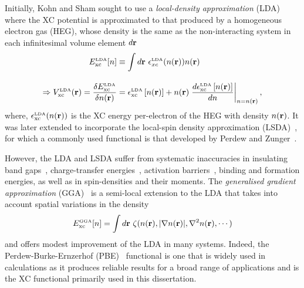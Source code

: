 Initially, Kohn and Sham sought to use a 
\emph{local-density approximation} (LDA)~\cite{PhysRev.140.A1133,PhysRevLett.45.566}
where the XC potential  
is approximated to that produced by
a homogeneous electron gas (HEG), 
whose density is the same as the non-interacting system  
in each infinitesimal volume element $d{\bf r}$ 
%
\begin{align}
E_\textrm{xc}^{\mbox{\tiny LDA}}[n] 
&\equiv \int d{\bf r}\ \epsilon_{xc}^{\mbox{\tiny LDA}}(n({\bf r}))n({\bf r})\nonumber \\[1em]
\Rightarrow V_\textrm{xc}^{\mbox{\tiny LDA}}({\bf r})
=\frac{\delta E_\textrm{xc}^{\mbox{\tiny LDA}}}{\delta n({\bf r})}
&=\epsilon_\textrm{xc}^{\mbox{\tiny LDA}}\left[n({\bf r})\right]
+ n({\bf r})\left.\frac{d\epsilon_\textrm{xc}^{\mbox{\tiny LDA}}\left[n({\bf r})\right]}{dn}\right|_{n=n({\bf r})},
\end{align}
%
where, $\epsilon_\textrm{xc}^{\mbox{\tiny LDA}}(n({\bf r}))$ 
is the XC energy per-electron 
of the HEG with density $n({\bf r})$.
%
It was later extended to incorporate 
the local-spin density approximation 
(LSDA)~\cite{0022-3719-5-13-012,PhysRevB.7.1912,PhysRevB.45.13244}, 
for which a commonly used functional 
is that developed 
by Perdew and Zunger~\cite{0022-3719-5-13-012,PhysRevB.23.5048}.

However, the LDA  and LSDA  
suffer from systematic inaccuracies 
in insulating band gaps~\cite{PhysRevB.93.195208,PhysRevLett.111.073003}, 
charge-transfer energies~\cite{PhysRevLett.95.146402,:/content/aip/journal/jcp/126/20/10.1063/1.2743004},
activation barriers~\cite{doi:10.1021/jp049908s},
 binding and formation energies,  
as well as in spin-densities and their moments.
%
The {\it generalised gradient approximation} 
(GGA)~\cite{PhysRevLett.77.3865} 
is a semi-local extension to the LDA  
that takes into account spatial variations 
in the density 
%
\begin{equation}
E_\textrm{xc}^{\mbox{\tiny GGA}}[n]=\int d\br\ \zeta(n(\br),|\nabla n(\br)|,\nabla^2n(\br),\cdots) 
\label{eq:gga}
\end{equation}
%
and offers modest improvement 
of the LDA in many systems.
%
Indeed, the Perdew-Burke-Ernzerhof (PBE)~\cite{PhysRevLett.77.3865} 
functional is one that is widely used in calculations 
as it produces reliable results for a broad range of applications 
and is the XC functional 
primarily used in this dissertation.

